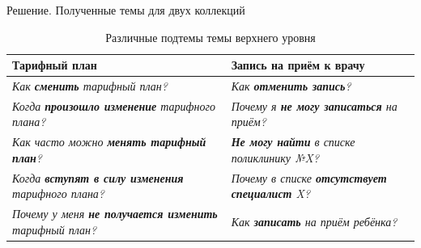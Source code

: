 \begin{frame}{Решение. Полученные темы для двух коллекций}

\begin{table}[!h]
\begin{tabularx}{\textwidth}{|X|X|}
  \hline
  \textbf{Тарифный план} & \textbf{Запись на приём к врачу} \\
  \hline
  \textsl{Как \textbf{сменить} тарифный план?} &   \textsl{Как \textbf{отменить запись}?}\\
  \textsl{Когда \textbf{произошло изменение} тарифного плана?} &   \textsl{Почему я \textbf{не могу записаться} на приём?}\\
  \textsl{Как часто можно \textbf{менять тарифный план}?} &  \textsl{\textbf{Не могу найти} в списке поликлинику №X?} \\
  \textsl{Когда \textbf{вступят в силу изменения} тарифного плана?} &    \textsl{Почему в списке \textbf{отсутствует специалист} X?} \\
  \textsl{Почему у меня \textbf{не получается изменить} тарифный план?} & 
  \textsl{Как \textbf{записать} на приём ребёнка?}\\
  \hline
\end{tabularx}
\caption{Различные подтемы темы верхнего уровня}
\label{topic_subtopic}
\end{table}
\normalsize

\end{frame}



